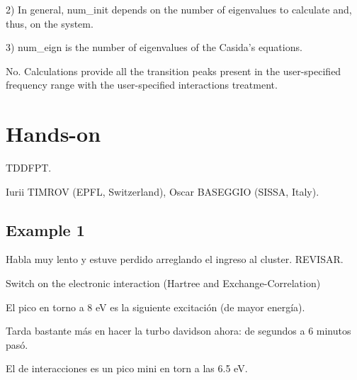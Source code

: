   2) In general, num\_init depends on the number of eigenvalues to calculate and, thus, on the system.

  3) num\_eign is the number of eigenvalues of the Casida's equations.


  No. Calculations provide all the transition peaks present in the user-specified frequency range with the user-specified interactions treatment.

  

\section{Hands-on}

   TDDFPT.

  	Iurii TIMROV (EPFL, Switzerland), Oscar BASEGGIO (SISSA, Italy).

\subsection{Example 1}

  Habla muy lento y estuve perdido arreglando el ingreso al cluster. REVISAR.

  Switch on the electronic interaction (Hartree and Exchange-Correlation)

  El pico en torno a 8 eV es la siguiente excitación (de mayor energía).

  Tarda bastante más en hacer la turbo davidson ahora: de segundos a 6 minutos pasó.

  El de interacciones es un pico mini en torn a las 6.5 eV.

